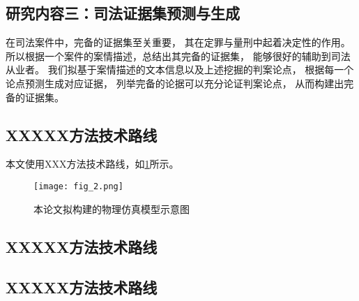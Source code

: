 \subsection{研究内容三：司法证据集预测与生成}
在司法案件中，完备的证据集至关重要，
其在定罪与量刑中起着决定性的作用。
所以根据一个案件的案情描述，总结出其完备的证据集，
能够很好的辅助到司法从业者。
我们拟基于案情描述的文本信息以及上述挖掘的判案论点，
根据每一个论点预测生成对应证据，
列举完备的论据可以充分论证判案论点，
从而构建出完备的证据集。

\subsection{XXXXX方法技术路线}

本文使用XXX方法技术路线，如\cref{fig_2}所示。

\begin{figure}[h]
	\centering
	\texttt{[image: fig\_2.png]}
	\caption{本论文拟构建的物理仿真模型示意图}
	\label{fig_2}
\end{figure}

\subsection{XXXXX方法技术路线}

\subsection{XXXXX方法技术路线}